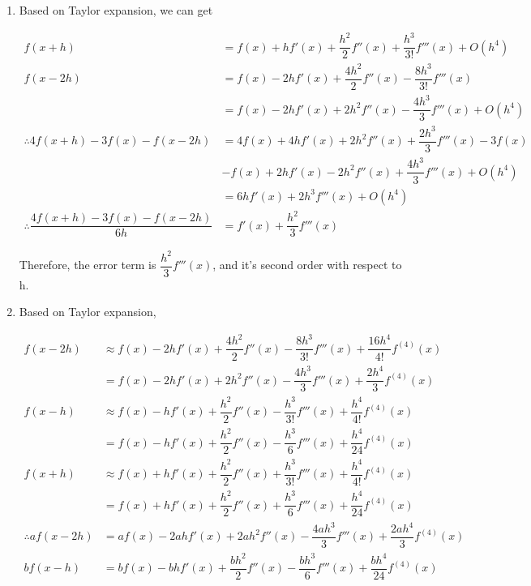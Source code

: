 \documentclass{article}
\begin{document}




\begin{enumerate}

\item
Based on Taylor expansion, we can get \begin{small}
\begin{align*}
f(x+h)&= f(x)+hf'(x)+\dfrac{h^2}{2}f''(x)+\dfrac{h^3}{3!}f'''(x)+O(h^4)\\
f(x-2h)&= f(x)-2hf'(x)+\dfrac{4h^2}{2}f''(x)-\dfrac{8h^3}{3!}f'''(x)\\
&=f(x)-2hf'(x)+2h^2f''(x)-\dfrac{4h^3}{3}f'''(x)+O(h^4)\\
\therefore 4f(x+h)-3f(x)-f(x-2h)&=4f(x)+4hf'(x)+2h^2f''(x)+\dfrac{2h^3}{3}f'''(x)-3f(x)\\&-f(x)+2hf'(x)-2h^2f''(x)+\dfrac{4h^3}{3}f'''(x)+O(h^4)\\
&=6hf'(x)+2h^3f'''(x)+O(h^4)\\
\therefore \dfrac{4f(x+h)-3f(x)-f(x-2h)}{6h}&=f'(x)+\dfrac{h^2}{3}f'''(x)
\end{align*}\end{small}
Therefore, the error term is $\dfrac{h^2}{3}f'''(x)$, and it's second order with respect to h.
\item
Based on Taylor expansion,\begin{small}\begin{align*}
f(x-2h)&\approx f(x)-2hf'(x)+\dfrac{4h^2}{2}f''(x)-\dfrac{8h^3}{3!}f'''(x)+\dfrac{16h^4}{4!}f^{(4)}(x)\\
&=f(x)-2hf'(x)+2h^2f''(x)-\dfrac{4h^3}{3}f'''(x)+\dfrac{2h^4}{3}f^{(4)}(x)\\
f(x-h)&\approx f(x)-hf'(x)+\dfrac{h^2}{2}f''(x)-\dfrac{h^3}{3!}f'''(x)+\dfrac{h^4}{4!}f^{(4)}(x)\\
&= f(x)-hf'(x)+\dfrac{h^2}{2}f''(x)-\dfrac{h^3}{6}f'''(x)+\dfrac{h^4}{24}f^{(4)}(x)\\
f(x+h)&\approx f(x)+hf'(x)+\dfrac{h^2}{2}f''(x)+\dfrac{h^3}{3!}f'''(x)+\dfrac{h^4}{4!}f^{(4)}(x)\\
&=f(x)+hf'(x)+\dfrac{h^2}{2}f''(x)+\dfrac{h^3}{6}f'''(x)+\dfrac{h^4}{24}f^{(4)}(x)\\
\therefore af(x-2h)&=af(x)-2ahf'(x)+2ah^2f''(x)-\dfrac{4ah^3}{3}f'''(x)+\dfrac{2ah^4}{3}f^{(4)}(x)\\
bf(x-h)&= bf(x)-bhf'(x)+\dfrac{bh^2}{2}f''(x)-\dfrac{bh^3}{6}f'''(x)+\dfrac{bh^4}{24}f^{(4)}(x)\\

\end{align*}
\end{small}
\end{enumerate}
\end{document}
